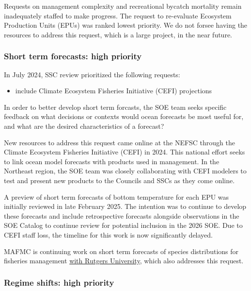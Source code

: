 \documentclass[
  10pt,
]{article}
\providecommand{\tightlist}{%
  \setlength{\itemsep}{0pt}\setlength{\parskip}{0pt}}
\begin{document}
Requests on management complexity and recreational bycatch mortality
remain inadequately staffed to make progress. The request to re-evaluate
Ecosystem Production Units (EPUs) was ranked lowest priority. We do not
forsee having the resources to address this request, which is a large
project, in the near future.

\hypertarget{short-term-forecasts-high-priority}{%
\subsubsection{Short term forecasts: high
priority}\label{short-term-forecasts-high-priority}}

In July 2024, SSC review prioritized the following requests:

\begin{itemize}
\tightlist
\item
  include Climate Ecosystem Fisheries Initiative (CEFI) projections
\end{itemize}

In order to better develop short term forcasts, the SOE team seeks
specific feedback on what decisions or contexts would ocean forecasts be
most useful for, and what are the desired characteristics of a forecast?

New resources to address this request came online at the NEFSC through
the Climate Ecosystem Fisheries Initiative (CEFI) in 2024. This national
effort seeks to link ocean model forecasts with products used in
management. In the Northeast region, the SOE team was closely
collaborating with CEFI modelers to test and present new products to the
Councils and SSCs as they come online.

A preview of short term forecasts of bottom temperature for each EPU was
initially reviewed in late February 2025. The intention was to continue
to develop these forecasts and include retrospective forecasts alongside
observations in the SOE Catalog to continue review for potential
inclusion in the 2026 SOE. Due to CEFI staff loss, the timeline for this
work is now significantly delayed.

MAFMC is continuing work on short term forecasts of species
distributions for fisheries management
\href{https://www.mafmc.org/s/Rutgers-Project-Overview.pdf}{with Rutgers
University}, which also addresses this request.

\hypertarget{regime-shifts-high-priority}{%
\subsubsection{Regime shifts: high
priority}\label{regime-shifts-high-priority}}
\end{document}
